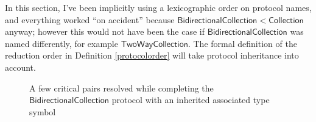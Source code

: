 \documentclass[headsepline,bibliography=totoc]{scrreport}
\newcommand{\namesym}[1]{\mathsf{#1}}
\newcommand{\proto}[1]{\bm{\mathsf{#1}}}
\newcommand{\protosym}[1]{[\proto{#1}]}
\newcommand{\assocsym}[2]{[\proto{#1}\colon\namesym{#2}]}
\theoremstyle{definition}
\theoremstyle{definition}
\theoremstyle{definition}
\begin{document}
In this section, I've been implicitly using a lexicographic order on protocol names, and everything worked ``on accident'' because $\proto{BidirectionalCollection}<\proto{Collection}$ anyway; however this would not have been the case if $\proto{BidirectionalCollection}$ was named differently, for example $\proto{TwoWayCollection}$. The formal definition of the reduction order in Definition \ref{protocolorder} will take protocol inheritance into account.

\begin{figure}\caption{A few critical pairs resolved while completing the $\proto{BidirectionalCollection}$ protocol with an inherited associated type symbol}\label{bidirectionalfig}
\begin{center}

\vspace{10mm}


\vspace{10mm}


\vspace{10mm}



\end{center}
\end{figure}
\end{document}

